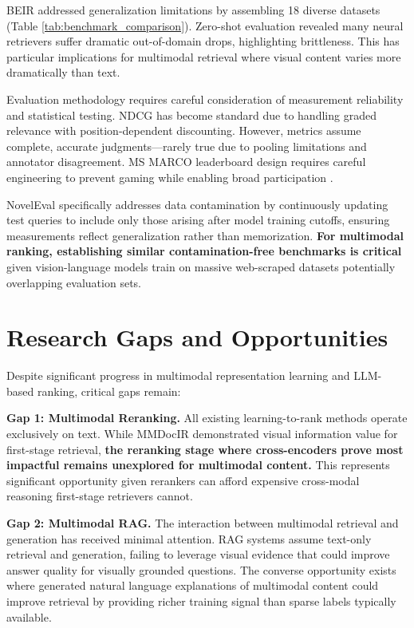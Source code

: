 BEIR \cite{thakur2021beir} addressed generalization limitations by assembling 18 diverse datasets (Table \ref{tab:benchmark_comparison}). Zero-shot evaluation revealed many neural retrievers suffer dramatic out-of-domain drops, highlighting brittleness. This has particular implications for multimodal retrieval where visual content varies more dramatically than text.

Evaluation methodology requires careful consideration of measurement reliability and statistical testing. NDCG has become standard due to handling graded relevance with position-dependent discounting. However, metrics assume complete, accurate judgments—rarely true due to pooling limitations and annotator disagreement. MS MARCO leaderboard design requires careful engineering to prevent gaming while enabling broad participation \cite{craswell2021msmarco}.

NovelEval specifically addresses data contamination by continuously updating test queries to include only those arising after model training cutoffs, ensuring measurements reflect generalization rather than memorization. \textbf{For multimodal ranking, establishing similar contamination-free benchmarks is critical} given vision-language models train on massive web-scraped datasets potentially overlapping evaluation sets.

\section{Research Gaps and Opportunities}

Despite significant progress in multimodal representation learning and LLM-based ranking, critical gaps remain:

\textbf{Gap 1: Multimodal Reranking.} All existing learning-to-rank methods operate exclusively on text. While MMDocIR demonstrated visual information value for first-stage retrieval, \textbf{the reranking stage where cross-encoders prove most impactful remains unexplored for multimodal content.} This represents significant opportunity given rerankers can afford expensive cross-modal reasoning first-stage retrievers cannot.

\textbf{Gap 2: Multimodal RAG.} The interaction between multimodal retrieval and generation has received minimal attention. RAG systems assume text-only retrieval and generation, failing to leverage visual evidence that could improve answer quality for visually grounded questions. The converse opportunity exists where generated natural language explanations of multimodal content could improve retrieval by providing richer training signal than sparse labels typically available.

